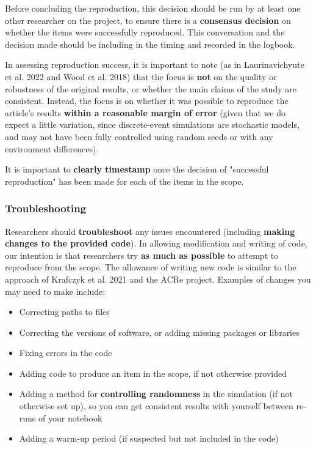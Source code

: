 Before concluding the reproduction, this decision should be run by at least one other researcher on the project, to ensure there is a \textbf{consensus decision} on whether the items were successfully reproduced. This conversation and the decision made should be including in the timing and recorded in the logbook.

In assessing reproduction success, it is important to note (as in Laurinavichyute et al. 2022\autocite{laurinavichyute_share_2022} and Wood et al. 2018\autocite{wood_push_2018}) that the focus is \textbf{not} on the quality or robustness of the original results, or whether the main claims of the study are consistent. Instead, the focus is on whether it was possible to reproduce the article's results \textbf{within a reasonable margin of error} (given that we do expect a little variation, since discrete-event simulations are stochastic models, and may not have been fully controlled using random seeds or with any environment differences).

It is important to \textbf{clearly timestamp} once the decision of "successful reproduction" has been made for each of the items in the scope.

\vspace{0.5cm}
\subsubsection{Troubleshooting}

Researchers should \textbf{troubleshoot} any issues encountered (including \textbf{making changes to the provided code}). In allowing modification and writing of code, our intention is that researchers try \textbf{as much as possible} to attempt to reproduce from the scope. The allowance of writing new code is similar to the approach of Krafczyk et al. 2021\autocite{krafczyk_learning_2021} and the ACRe project\autocite{berkeley_initiative_for_transparency_in_the_social_sciences_guide_2022}. Examples of changes you may need to make include:
\begin{itemize}
    \item Correcting paths to files
    \item Correcting the versions of software, or adding missing packages or libraries
    \item Fixing errors in the code
    \item Adding code to produce an item in the scope, if not otherwise provided
    \item Adding a method for \textbf{controlling randomness} in the simulation (if not otherwise set up), so you can get consistent results with yourself between re-runs of your notebook
    \item Adding a warm-up period (if suspected but not included in the code)
\end{itemize}

